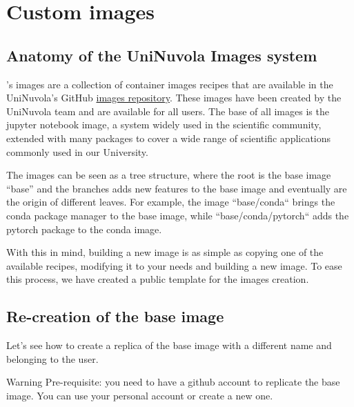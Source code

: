 \section{Custom images}
\subsection{Anatomy of the UniNuvola Images system}\label{image_anatomy}
\uninuvola's images are a collection of container images recipes that are
available in the UniNuvola's GitHub \href{https://github.com/UniNuvola/images}
{images repository}. 
These images have been created by the UniNuvola team and are available for all users.
The base of all images is the jupyter notebook image, a system widely used in the
scientific community, extended with many packages to cover a wide range of
scientific applications commonly used in our University.

The images can be seen as a tree structure, where the root is the base image
``base'' and the branches adds new features to the base image and eventually 
are the origin of different leaves. 
For example, the image ``base/conda`` brings the conda package manager to the base
image, while ``base/conda/pytorch`` adds the pytorch package to the conda image.

With this in mind, building a new image is as simple as copying one of the
available recipes, modifying it to your needs and building a new image.
To ease this process, we have created a public template for the images creation.

\subsection{Re-creation of the base image}\label{image_recreation}
Let's see how to create a replica of the base image with a different name and belonging to the user.

\begin{bclogo}[logo=\bcinfo, couleurBarre=orange, noborder=true, couleur=white]{Warning}
  Pre-requisite: you need to have a github account to replicate the base
  image. You can use your personal account or create a new one.
\end{bclogo}

